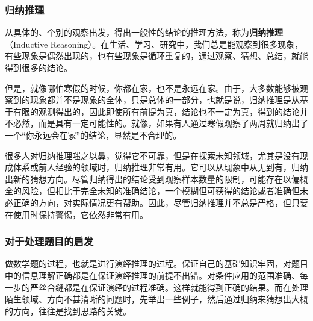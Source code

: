 \subsubsection{归纳推理}

从具体的、个别的观察出发，得出一般性的结论的推理方法，称为\textbf{归纳推理}（Inductive Reasoning）。在生活、学习、研究中，我们总是能观察到很多现象，有些现象是偶然出现的，也有些现象是循环重复的，通过观察、猜想、总结，就能得到很多的结论。

但是，就像哪怕寒假的时候，你都在家，也不是永远在家。由于，大多数能够被观察到的现象都并不是现象的全体，只是总体的一部分，也就是说，归纳推理是从基于有限的观测得出的，因此即使所有前提为真，结论也不一定为真，得到的结论并不必然，而是具有一定可能性的。就像，如果有人通过寒假观察了两周就归纳出了一个“你永远会在家”的结论，显然是不合理的。

很多人对归纳推理嗤之以鼻，觉得它不可靠，但是在探索未知领域，尤其是没有现成体系或前人经验的领域时，归纳推理非常有用。它可以从现象中从无到有，归纳出新的猜想方向。尽管归纳得出的结论受到观察样本数量的限制，可能存在以偏概全的风险，但相比于完全未知的准确结论，一个模糊但可获得的结论或者准确但未必正确的方向，对实际情况更有帮助。因此，尽管归纳推理并不总是严格，但只要在使用时保持警惕，它依然非常有用。

\subsubsection{对于处理题目的启发}

做数学题的过程，也就是进行演绎推理的过程。保证自己的基础知识牢固，对题目中的信息理解正确都是在保证演绎推理的前提不出错。对条件应用的范围准确、每一步的严丝合缝都是在保证演绎的过程准确。这样就能得到正确的结果。而在处理陌生领域、方向不甚清晰的问题时，先举出一些例子，然后通过归纳来猜想出大概的方向，往往是找到思路的关键。